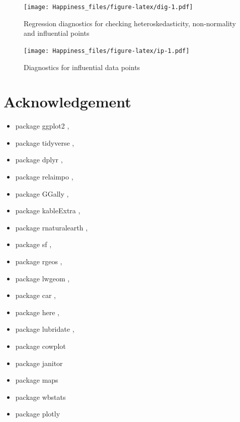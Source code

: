 \documentclass[11pt,a4paper,]{article}
\providecommand{\tightlist}{%
  \setlength{\itemsep}{0pt}\setlength{\parskip}{0pt}}
\begin{document}
\begin{figure}
\centering
\texttt{[image: Happiness\_files/figure-latex/dig-1.pdf]}
\caption{\label{fig:dig}Regression diagnostics for checking heteroskedasticity, non-normality and influential points}
\end{figure}

\begin{figure}
\centering
\texttt{[image: Happiness\_files/figure-latex/ip-1.pdf]}
\caption{\label{fig:ip}Diagnostics for influential data points}
\end{figure}

\clearpage

\hypertarget{acknowledgement}{%
\section{Acknowledgement}\label{acknowledgement}}

\begin{itemize}
\tightlist
\item
  package ggplot2 \autocite{ggplot2},
\item
  package tidyverse \autocite{tidyverse},
\item
  package dplyr \autocite{dplyr},
\item
  package relaimpo \autocite{relaimpo},
\item
  package GGally \autocite{GGally},
\item
  package kableExtra \autocite{kableExtra},
\item
  package rnaturalearth \autocite{rnaturalearth},
\item
  package sf \autocite{sf},
\item
  package rgeos \autocite{rgeos},
\item
  package lwgeom \autocite{lwgeom},
\item
  package car \autocite{car},
\item
  package here \autocite{here},
\item
  package lubridate \autocite{lubridate},
\item
  package cowplot \autocite{cowplot}
\item
  package janitor \autocite{janitor}
\item
  package maps \autocite{maps}
\item
  package wbstats \autocite{wbstats}
\item
  package plotly \autocite{plotly}
\end{itemize}

\clearpage

\printbibliography
\end{document}
